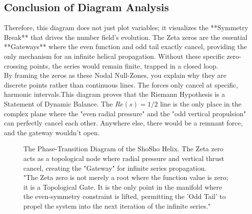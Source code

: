 \documentclass[11pt,a4paper]{article}
\begin{document}
\subsection*{Conclusion of Diagram Analysis}
Therefore, this diagram does not just plot variables; it visualizes the **Symmetry Break** that drives the number field's evolution. The Zeta zeros are the essential **Gateways** where the even function and odd tail exactly cancel, providing the only mechanism for an infinite helical propagation. Without these specific zero-crossing points, the series would remain finite, trapped in a closed loop.\\

By framing the zeros as these Nodal Null-Zones, you explain why they are discrete points rather than continuous lines. The forces only cancel at specific, harmonic intervals.This diagram proves that the Riemann Hypothesis is a Statement of Dynamic Balance. The $Re(s)=1/2$ line is the only place in the complex plane where the "even radial pressure" and the "odd vertical propulsion" can perfectly cancel each other. Anywhere else, there would be a remnant force, and the gateway wouldn't open.\\

\begin{figure}[htbp]
\centering
{}
\caption{The Phase-Transition Diagram of the ShoSho Helix. The Zeta zero acts as a topological node where radial pressure and vertical thrust cancel, creating the "Gateway" for infinite series propagation.\\
"The Zeta zero is not merely a root where the function value is zero; it is a Topological Gate. It is the only point in the manifold where the even-symmetry constraint is lifted, permitting the 'Odd Tail' to propel the system into the next iteration of the infinite series."}
\label{fig:phase_transition}
\end{figure}
\end{document}
